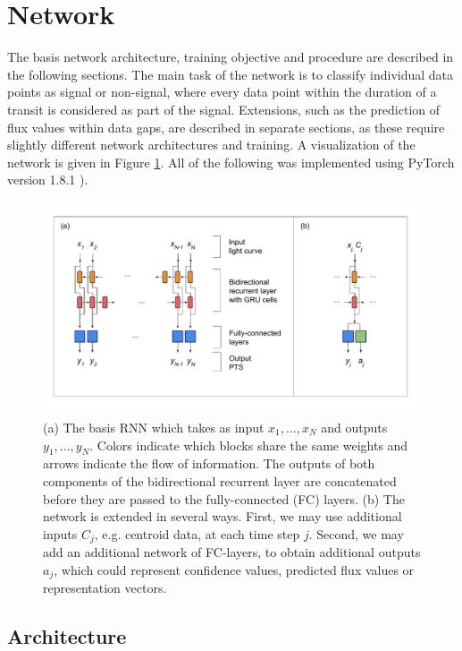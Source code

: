 
\section{Network}
\label{sec:network}

The basis network architecture, training objective and procedure are described in the following sections. The main task of the network is to classify individual data points as signal or non-signal, where every data point within the duration of a transit is considered as part of the signal. Extensions, such as the prediction of flux values within data gaps, are described in separate sections, as these require slightly different network architectures and training. A visualization of the network is given in Figure \ref{fig:network}. All of the following was implemented using PyTorch version 1.8.1 \citep{paszke2019pytorch}). 

\begin{figure}
    \centering
    \includegraphics[width=0.7\linewidth]{Methodology/Figures/network_drawing.pdf}
    \caption{(a) The basis RNN which takes as input $x_1,\dots,x_{N}$ and outputs $y_1,\dots,y_{N}$. Colors indicate which blocks share the same weights and arrows indicate the flow of information. The outputs of both components of the bidirectional recurrent layer are concatenated before they are passed to the fully-connected (FC) layers. (b) The network is extended in several ways. First, we may use additional inputs $C_j$, e.g. centroid data, at each time step $j$. Second, we may add an additional network of FC-layers, to obtain additional outputs $a_j$, which could represent confidence values, predicted flux values or representation vectors.}
    \label{fig:network}
\end{figure}

\subsection{Architecture}
\label{sec:architecture}

